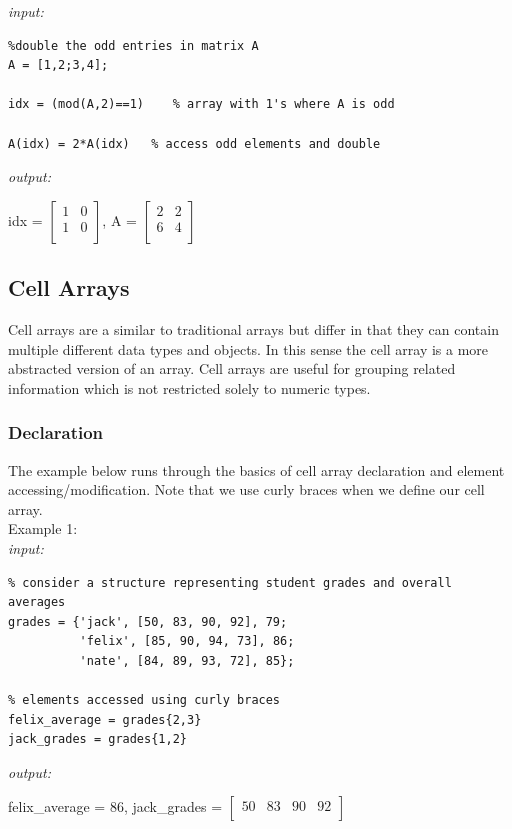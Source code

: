 \documentclass[../MATLAB_Primer.tex]{subfiles}
\begin{document}
\textit{input:}
\begin{lstlisting}
%double the odd entries in matrix A 
A = [1,2;3,4];
    
idx = (mod(A,2)==1)    % array with 1's where A is odd

A(idx) = 2*A(idx)   % access odd elements and double
\end{lstlisting}
\textit{output:}
\begin{center}
    idx = 
    $\begin{bmatrix}
    1 & 0\\
    1 & 0\\
    \end{bmatrix}$,\quad
    A =
    $\begin{bmatrix}
    2 & 2\\
    6 & 4\\
    \end{bmatrix}$
\end{center}

\subsection{Cell Arrays}
Cell arrays are a similar to traditional arrays but differ in that they can contain multiple different data types and objects.  In this sense the cell array is a more abstracted version of an array. Cell arrays are useful for grouping related information which is not restricted solely to numeric types.

\subsubsection{Declaration}
The example below runs through the basics of cell array declaration and element accessing/modification. Note that we use curly braces when we define our cell array.\\

Example 1:\\

\textit{input:}
\begin{lstlisting}
% consider a structure representing student grades and overall averages 
grades = {'jack', [50, 83, 90, 92], 79;
          'felix', [85, 90, 94, 73], 86; 
          'nate', [84, 89, 93, 72], 85};
          
% elements accessed using curly braces 
felix_average = grades{2,3}
jack_grades = grades{1,2}
\end{lstlisting}
\textit{output:}
\begin{center}
    felix\_average = 86,\quad
    jack\_grades =
    $\begin{bmatrix}
    50 & 83 & 90 & 92\\
    \end{bmatrix}$
\end{center}
\end{document}

